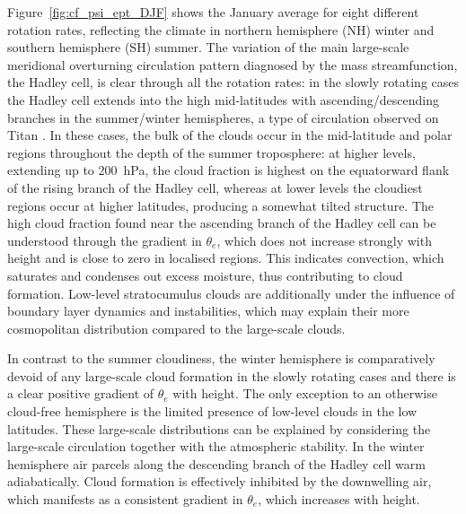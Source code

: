 Figure~\ref{fig:cf_psi_ept_DJF} shows the January average for eight different rotation rates, reflecting the climate in northern hemisphere (NH) winter and southern hemisphere (SH) summer. The variation of the main large-scale meridional overturning circulation pattern diagnosed by the mass streamfunction, the Hadley cell, is clear through all the rotation rates: in the slowly rotating cases the Hadley cell extends into the high mid-latitudes with ascending/descending branches in the summer/winter hemispheres, a type of circulation observed on Titan \citep[e.g.,][]{mitchell2016-Climate}. In these cases, the bulk of the clouds occur in the mid-latitude and polar regions throughout the depth of the summer troposphere: at higher levels, extending up to \SI{200}{\hecto\Pa}, the cloud fraction is highest on the equatorward flank of the rising branch of the Hadley cell, whereas at lower levels the cloudiest regions occur at higher latitudes, producing a somewhat tilted structure. The high cloud fraction found near the ascending branch of the Hadley cell can be understood through the gradient in $\theta_e$, which does not increase strongly with height and is close to zero in localised regions. This indicates convection, which saturates and condenses out excess moisture, thus contributing to cloud formation. Low-level stratocumulus clouds are additionally under the influence of boundary layer dynamics and instabilities, which may explain their more cosmopolitan distribution compared to the large-scale clouds.

In contrast to the summer cloudiness, the winter hemisphere is comparatively devoid of any large-scale cloud formation in the slowly rotating cases and there is a clear positive gradient of $\theta_e$ with height. The only exception to an otherwise cloud-free hemisphere is the limited presence of low-level clouds in the low latitudes. These large-scale distributions can be explained by considering the large-scale circulation together with the atmospheric stability. In the winter hemisphere air parcels along the descending branch of the Hadley cell warm adiabatically. Cloud formation is effectively inhibited by the downwelling air, which manifests as a consistent gradient in $\theta_e$, which increases with height.


